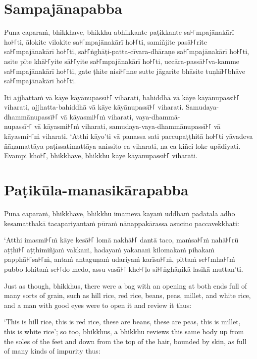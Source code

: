 \paliPage
\section*{Sampajānapabba}

Puna caparaṁ, bhikkhave, bhikkhu abhikkante paṭikkante sa꜔꜒mpajānakārī ho꜔꜒ti,
ālokite vilokite sa꜔꜒mpajānakārī ho꜔꜒ti, samiñjite pasā꜔꜒rite sa꜔꜒mpajānakārī ho꜔꜒ti,
sa꜔꜒ṅghāṭi-patta-cīvara-dhāraṇe sa꜔꜒mpajānakārī ho꜔꜒ti, asite pīte khā꜔꜒yite sā꜔꜒yite
sa꜔꜒mpajānakārī ho꜔꜒ti, uccāra-passā꜔꜒va-kamme sa꜔꜒mpajānakārī ho꜔꜒ti, gate ṭhite nisi꜔꜒nne
sutte jāgarite bhāsite tuṇhī꜔꜒bhāve sa꜔꜒mpajānakārī ho꜔꜒ti.

Iti ajjhattaṁ vā kāye kāyānupassī꜔꜒ viharati, bahiddhā vā kāye kāyānupassī꜔꜒
viharati, ajjhatta-bahiddhā vā kāye kāyānupassī꜔꜒ viharati. Samudaya-dhammānupassī꜔꜒
vā kāyasmi꜔꜒ṁ viharati, vaya-dhammā-\\
nupassī꜔꜒ vā kāyasmi꜔꜒ṁ viharati, samudaya-vaya-dhammānupassī꜔꜒ vā kāyasmi꜔꜒ṁ viharati.
‘Atthi kāyo’ti vā panassa sati paccupaṭṭhitā ho꜔꜒ti yāvadeva ñāṇamattāya
paṭissatimattāya anissito ca viharati, na ca kiñci loke upādiyati. Evampi kho꜔꜒,
bhikkhave, bhikkhu kāye kāyānupassī꜔꜒ viharati.


\section*{Paṭikūla-manasikārapabba}

Puna caparaṁ, bhikkhave, bhikkhu imameva kāyaṁ uddhaṁ pādatalā adho kesamatthakā
tacapariyantaṁ pūraṁ nānappakārassa asucino paccavekkhati:

‘Atthi imasmi꜔꜒ṁ kāye kesā꜔꜒ lomā nakhā꜔꜒ dantā taco, maṁsa꜔꜒ṁ nahā꜔꜒rū aṭṭhī꜔꜒ aṭṭhimiñjaṁ
vakkaṁ, hadayaṁ yakanaṁ kilomakaṁ pihakaṁ papphā꜔꜒sa꜔꜒ṁ, antaṁ antaguṇaṁ udariyaṁ
karīsa꜔꜒ṁ, pittaṁ se꜔꜒mha꜔꜒ṁ pubbo lohitaṁ se꜔꜒do medo, assu vasā꜔꜒ khe꜔꜒ḷo si꜔꜒ṅghāṇikā
lasikā muttan’ti.

\englishPage

Just as though, bhikkhus, there were a bag with an opening at both ends full of
many sorts of grain, such as hill rice, red rice, beans, peas, millet, and white
rice, and a man with good eyes were to open it and review it thus:

‘This is hill rice, this is red rice, these are beans, these are peas, this is
millet, this is white rice’; so too, bhikkhus, a bhikkhu reviews this same body
up from the soles of the feet and down from the top of the hair, bounded by
skin, as full of many kinds of impurity thus:

